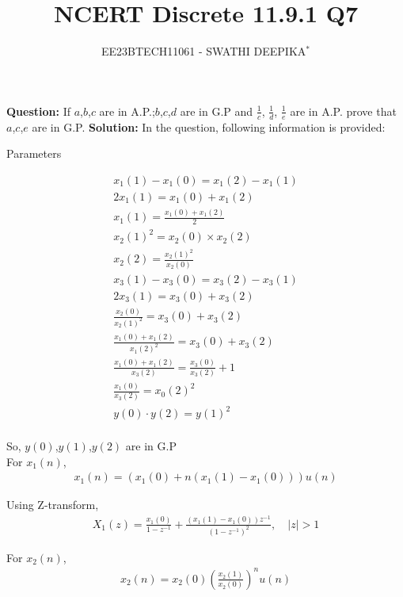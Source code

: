 \documentclass[journal,12pt,twocolumn]{IEEEtran}
\title{
	
\title{NCERT Discrete 11.9.1 Q7}
\author{EE23BTECH11061 - SWATHI DEEPIKA$^{*}$%
}


}
\providecommand{\brak}[1]{\ensuremath{\left(#1\right)}}
\theoremstyle{remark}
\newcommand{\solution}{\noindent \textbf{Solution: }}
\begin{document}
\maketitle

\textbf{Question:} 
If $a$,$b$,$c$ are in A.P.;$b$,$c$,$d$ are in G.P and $\frac{1}{c}$, $\frac{1}{d}$, $\frac{1}{e}$ are in A.P. prove that $a$,$c$,$e$ are in G.P.
\solution
In the question, following information is provided:
 \begin{table}[h]
 	\centering
 	\resizebox{6 cm}{!}{
 		
 	}
 	\vspace{6 pt}
 	\caption{Parameters}
 	\label{tab:swa_tabel} 
 \end{table}

 
\begin{align}
x_1(1)-x_1(0) = x_1(2)-x_1(1)\\
2x_1(1)=x_1(0)+x_1(2)\\
x_1(1)=\frac{x_1(0)+x_1(2)}{2}\\
x_2(1)^2 = x_2(0)\times x_2(2)\\
x_2(2)= \frac{{x_2(1)}^2}{x_2(0)}\\
x_3(1) - x_3(0) = x_3(2) - x_3(1)\\
2{x_3(1)} = x_3(0) + x_3(2)\\
\frac{x_2(0)}{x_2(1)^2} = x_3(0) + x_3(2)\\
\frac{x_1(0) + x_1(2)}{{x_1(2)}^2} = x_3(0) + x_3(2)\\
\frac{x_1(0)+x_1(2)}{x_3(2)} = \frac{x_3(0)}{x_3(2)} + 1\\
\frac{x_1(0)}{x_3(2)} = {x_0(2)}^2\\
y(0) \cdot y(2) = {y(1)}^2\\
\end{align}

So, $y(0)$,$y(1)$,$y(2)$ are in G.P\\


For $x_1(n)$,
\begin{align}
x_1(n) = (x_1(0) + n(x_1(1)-x_1(0)))u(n)
\end{align}

Using Z-transform, 
\begin{align}
X_1(z) = \frac{x_1(0)}{1-z^{-1}} + \frac{(x_1(1)-x_1(0))z^{-1}}{(1-z^{-1})^2} ,
\quad |z| > 1
\end{align}

For $x_2(n)$,
\begin{align}
x_2(n) = x_2(0)\brak{\frac{x_2(1)}{x_2(0)}}^n u(n)
\end{align}
\end{document}
